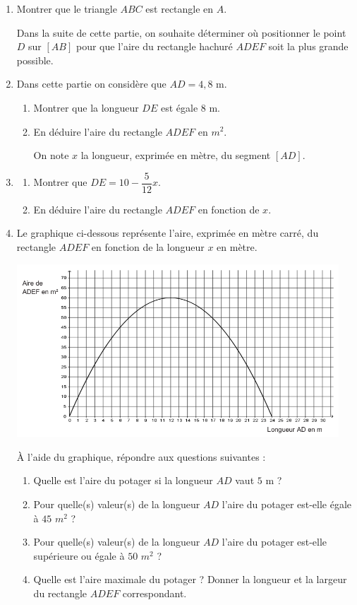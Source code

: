 \begin{enumerate}
    \item Montrer que le triangle $ABC$ est rectangle en $A$.
    
    Dans la suite de cette partie, on souhaite déterminer où positionner le point $D$ sur $[AB]$ pour
    que l’aire du rectangle hachuré $ADEF$ soit la plus grande possible.
    \item Dans cette partie on considère que $AD = 4,8$ m.
    \begin{enumerate}
        \item Montrer que la longueur $DE$ est égale $8$ m.
        \item En déduire l'aire du rectangle $ADEF$ en $m^2$.
        
        On note $x$ la longueur, exprimée en mètre, du segment $[AD]$.
    \end{enumerate}
    \item 
    \begin{enumerate}
        \item Montrer que $DE = 10 -\dfrac{5}{12}x$.
        \item En déduire l'aire du rectangle $ADEF$ en fonction de $x$.
    \end{enumerate}
    \clearpage
    \item Le graphique ci-dessous représente l'aire, exprimée en mètre carré, du rectangle $ADEF$
    en fonction de la longueur $x$ en mètre.
    \begin{center}
        \includegraphics[width=0.95\textwidth]{./images/2022-g3-ex3-img1.png}
    \end{center}

    À l'aide du graphique, répondre aux questions suivantes :
    \begin{enumerate}
        \item Quelle est l'aire du potager si la longueur $AD$ vaut $5$ m ?
        \item Pour quelle(s) valeur(s) de la longueur $AD$ l'aire du potager est-elle égale à $45$ $m^2$ ?
        \item Pour quelle(s) valeur(s) de la longueur $AD$ l'aire du potager est-elle supérieure ou égale à $50$ $m^2$ ?
        \item Quelle est l’aire maximale du potager ? Donner la longueur et la largeur du rectangle $ADEF$ correspondant.
    \end{enumerate}
\end{enumerate}

